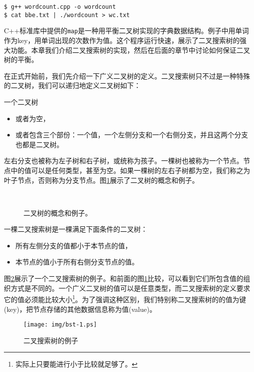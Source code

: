 \documentclass[UTF8]{article}
\begin{document}
\begin{verbatim}
$ g++ wordcount.cpp -o wordcount
$ cat bbe.txt | ./wordcount > wc.txt
\end{verbatim}

C++标准库中提供的\texttt{map}是一种用平衡二叉树实现的字典数据结构。例子中用单词作为key，用单词出现的次数作为值。这个程序运行快速，展示了二叉搜索树的强大功能。本章我们介绍二叉搜索树的实现，然后在后面的章节中讨论如何保证二叉树的平衡。

在正式开始前，我们先介绍一下广义二叉树的定义。二叉搜索树只不过是一种特殊的二叉树，我们可以递归地定义二叉树如下：

一个二叉树
\begin{itemize}
\item 或者为空，
\item 或者包含三个部份：一个值，一个左侧分支和一个右侧分支，并且这两个分支也都是二叉树。
\end{itemize}

左右分支也被称为左子树和右子树，或统称为孩子。一棵树也被称为一个节点。节点中的值可以是任何类型，甚至为空。如果一棵树的左右子树都为空，我们称之为叶子节点，否则称为分支节点。图\ref{fig:binary-tree-example}展示了二叉树的概念和例子。

\begin{figure}[htbp]
  \centering
   \\
  \caption{二叉树的概念和例子。}
  \label{fig:binary-tree-example}
\end{figure}

一棵二叉搜索树是一棵满足下面条件的二叉树：
\begin{itemize}
\item 所有左侧分支的值都小于本节点的值，
\item 本节点的值小于所有右侧分支节点的值。
\end{itemize}

图\ref{fig:bst-example}展示了一个二叉搜索树的例子。和前面的图\ref{fig:binary-tree-example}比较，可以看到它们所包含值的组织方式是不同的。一个广义二叉树的值可以是任意类型，而二叉搜索树的定义要求它的值必须能比较大小\footnote{实际上只要能进行小于比较就足够了。}。为了强调这种区别，我们特别称二叉搜索树的的值为键(key)，把节点存储的其他数据信息称为值(value)。

\begin{figure}[htbp]
  \centering
  \texttt{[image: img/bst-1.ps]}
  \caption{二叉搜索树的例子} \label{fig:bst-example}
\end{figure}
\end{document}
